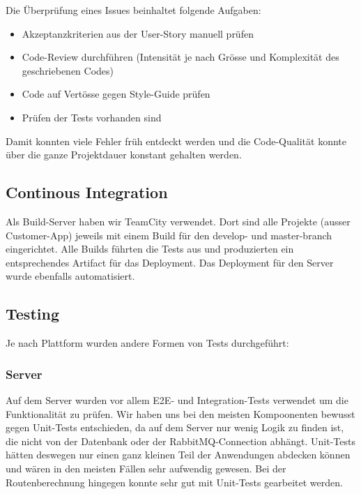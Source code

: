 Die Überprüfung eines Issues beinhaltet folgende Aufgaben:

\begin{itemize}
	\item{Akzeptanzkriterien aus der User-Story manuell prüfen}
	\item{Code-Review durchführen (Intensität je nach Grösse und Komplexität des geschriebenen Codes)}
	\item{Code auf Vertösse gegen Style-Guide prüfen}
	\item{Prüfen der Tests vorhanden sind}
\end{itemize}

Damit konnten viele Fehler früh entdeckt werden und die Code-Qualität konnte über die ganze Projektdauer konstant gehalten werden.

\subsection{Continous Integration}

Als Build-Server haben wir TeamCity verwendet. Dort sind alle Projekte (ausser Customer-App) jeweils mit einem Build für den develop- und master-branch eingerichtet. Alle Builds führten die Tests aus und produzierten ein entsprechendes Artifact für das Deployment. Das Deployment für den Server wurde ebenfalls automatisiert.

\subsection{Testing}

Je nach Plattform wurden andere Formen von Tests durchgeführt:

\subsubsection{Server}

Auf dem Server wurden vor allem \Gls{E2E}- und \Gls{Integration}-Tests verwendet um die Funktionalität zu prüfen. Wir haben uns bei den meisten Kompoonenten bewusst gegen \Gls{Unit-Tests} entschieden, da auf dem Server nur wenig Logik zu finden ist, die nicht von der Datenbank oder der RabbitMQ-Connection abhängt. Unit-Tests hätten deswegen nur einen ganz kleinen Teil der Anwendungen abdecken können und wären in den meisten Fällen sehr aufwendig gewesen. Bei der Routenberechnung hingegen konnte sehr gut mit Unit-Tests gearbeitet werden.\\

